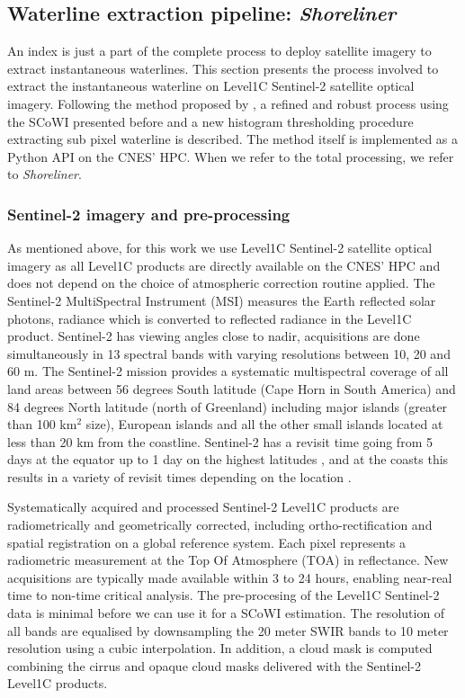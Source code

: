 \documentclass[remotesensing,technicalnote,submit,pdftex,moreauthors]{Definitions/mdpi}
\begin{document}
\subsection{Waterline extraction pipeline: \textit{Shoreliner}}\label{extract_process}
An index is just a part of the complete process to deploy satellite imagery to extract instantaneous waterlines. This section presents the process involved to extract the instantaneous waterline on Level1C Sentinel-2 satellite optical imagery. Following the method proposed by \citep{Bishop_sub_pixel}, a refined and robust process using the SCoWI presented before and a new histogram thresholding procedure extracting sub pixel waterline is described. The method itself is implemented as a Python API on the CNES' HPC. When we refer to the total processing, we refer to \textit{Shoreliner}.

\subsubsection{Sentinel-2 imagery and pre-processing}
As mentioned above, for this work we use Level1C Sentinel-2 satellite optical imagery as all Level1C products are directly available on the CNES' HPC and does not depend on the choice of atmospheric correction routine applied. The Sentinel-2 MultiSpectral Instrument (MSI) measures the Earth reflected solar photons, radiance which is converted to reflected radiance in the Level1C product. Sentinel-2 has viewing angles close to nadir, acquisitions are done simultaneously in 13 spectral bands with varying resolutions between 10, 20 and 60 m. The Sentinel-2 mission provides a systematic multispectral coverage of all land areas between 56 degrees South latitude (Cape Horn in South America) and 84 degrees North latitude (north of Greenland) including major islands (greater than 100 km$^2$ size), European islands and all the other small islands located at less than 20 km from the coastline. Sentinel-2 has a revisit time going from 5 days at the equator up to 1 day on the highest latitudes \citep{ESAreq}, and at the coasts this results in a variety of revisit times depending on the location \citep{BERGSMA2020}.

Systematically acquired and processed Sentinel-2 Level1C products are radiometrically and geometrically corrected, including ortho-rectification and spatial registration on a global reference system. Each pixel represents a radiometric measurement at the Top Of Atmosphere (TOA) in reflectance. New acquisitions are typically made available within 3 to 24 hours, enabling near-real time to non-time critical analysis. The pre-procesing of the Level1C Sentinel-2 data is minimal before we can use it for a SCoWI estimation. The resolution of all bands are equalised by downsampling the 20 meter SWIR bands to 10 meter resolution using a cubic interpolation. In addition, a cloud mask is computed combining the cirrus and opaque cloud masks delivered with the Sentinel-2 Level1C products.
\end{document}
